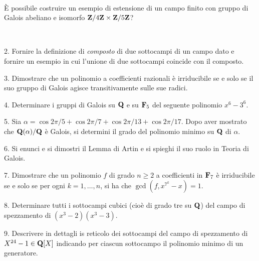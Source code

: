 \ \dotfill\ \bigskip\bigskip\bigskip\vfil

 \`E possibile costruire un esempio di estensione di un campo finito con gruppo di Galois abeliano e isomorfo ${\bf Z}/4{\bf Z}\times{\bf Z}/5{\bf Z}$?\medskip\bigskip\bigskip

\ \dotfill\ \bigskip\bigskip\bigskip

\vfil\eject

\item{2.} Fornire la definizione di {\it composto} di due sottocampi di un campo dato e fornire un esempio in cui l'unione di due sottocampi coincide con il composto.
\vv


\item{3.} Dimostrare che un polinomio a coefficienti razionali \`e irriducibile se e solo 
se il suo gruppo di Galois agisce transitivamente sulle sue radici.
\vv

\item{4.} Determinare i gruppi di Galois su ${\bf Q}$  e su ${\bf F}_5$ del seguente polinomio $x^6-3^6$.\ve\ \vs

\item{5.} Sia $\alpha=\cos2\pi/5+\cos2\pi/7+\cos2\pi/13+\cos2\pi/17$. Dopo aver mostrato che ${\bf Q}(\alpha)/{\bf Q}$ \`e Galois, si determini il grado del polinomio minimo su ${\bf Q}$ di $\alpha$.
\vv


\item{6.} Si enunci e si dimostri il Lemma di Artin e si spieghi il suo ruolo in Teoria di Galois.\vv


\item{7.} Dimostrare che un polinomio $f$ di grado $n\ge2$ a coefficienti in ${\bf F}_{7}$ \`e irriducibile se e solo se per ogni $k=1,\ldots,n$, si ha che $\gcd(f,x^{7^k}-x)=1$.\ve\ \vs

\item{8.} Determinare tutti i sottocampi cubici (cio\`e di grado tre su ${\bf Q}$) del campo di spezzamento di $(x^3-2)(x^3-3)$.\vv

\item{9.} Descrivere in dettagli is reticolo dei sottocampi del campo di spezzamento di $X^{24}-1\in{\bf Q}[X]$ indicando per ciascun sottocampo il polinomio minimo di un generatore.
\ \vst

 \bye

